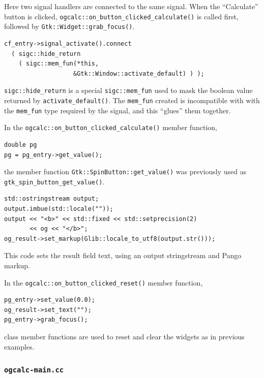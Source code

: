 \documentclass[a4paper,oneside]{article}
\newcommand{\filename}[1]{\texttt{#1}}
\newcommand{\class}[1]{\texttt{#1}}
\newcommand{\function}[1]{\texttt{#1()}}
\begin{document}
Here two signal handlers are connected to the same signal.  When the
``Calculate'' button is clicked,
\function{ogcalc::on\_button\_clicked\_calculate} is called first,
followed by \function{Gtk::Widget::grab\_focus}.

\begin{lstlisting}[numbers=none, language={[GNU]C++}]
cf_entry->signal_activate().connect
  ( sigc::hide_return
    ( sigc::mem_fun(*this,
                   &Gtk::Window::activate_default) ) );
\end{lstlisting}

\class{sigc::hide\_return} is a special \class{sigc::mem\_fun} used to
mask the boolean value returned by \function{activate\_default}.  The
\class{mem\_fun} created is incompatible with with the
\class{mem\_fun} type required by the signal, and this ``glues'' them
together.

In the \function{ogcalc::on\_button\_clicked\_calculate} member
function,

\begin{lstlisting}[numbers=none, language={[GNU]C++}]
double pg
pg = pg_entry->get_value();
\end{lstlisting}

\noindent the member function \function{Gtk::SpinButton::get\_value}
was previously used as \function{gtk\_spin\_button\_get\_value}.

\begin{lstlisting}[numbers=none, language={[GNU]C++}]
std::ostringstream output;
output.imbue(std::locale(""));
output << "<b>" << std::fixed << std::setprecision(2)
       << og << "</b>";
og_result->set_markup(Glib::locale_to_utf8(output.str()));
\end{lstlisting}

This code sets the result field text, using an output stringstream and
Pango markup.

In the \function{ogcalc::on\_button\_clicked\_reset} member function,

\begin{lstlisting}[numbers=none, language={[GNU]C++}]
pg_entry->set_value(0.0);
og_result->set_text("");
pg_entry->grab_focus();
\end{lstlisting}

\noindent class member functions are used to reset and clear the
widgets as in previous examples.

\subsubsection{\filename{ogcalc-main.cc}}
\end{document}
